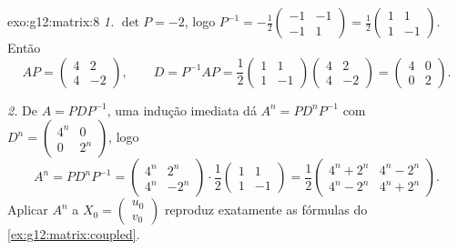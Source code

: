 \begin{solution}{exo:g12:matrix:8}
\emph{1.} $\det P = -2$, logo
$P^{-1} = -\frac12\begin{pmatrix} -1 & -1\\ -1 & 1\end{pmatrix}
= \frac12\begin{pmatrix} 1 & 1\\ 1 & -1\end{pmatrix}$. Então
\[
AP = \begin{pmatrix} 4 & 2\\ 4 & -2 \end{pmatrix}, \qquad
D = P^{-1}AP = \frac12\begin{pmatrix} 1&1\\1&-1\end{pmatrix}
\begin{pmatrix} 4&2\\4&-2\end{pmatrix}
= \begin{pmatrix} 4 & 0\\ 0 & 2\end{pmatrix}.
\]

\emph{2.} De $A = PDP^{-1}$, uma indução imediata dá
$A^n = PD^nP^{-1}$ com
$D^n = \begin{pmatrix} 4^n & 0\\ 0 & 2^n\end{pmatrix}$, logo
\[
A^n = P D^n P^{-1}
= \begin{pmatrix} 4^n & 2^n\\ 4^n & -2^n\end{pmatrix}\cdot
\frac12\begin{pmatrix} 1&1\\1&-1\end{pmatrix}
= \frac12\begin{pmatrix} 4^n + 2^n & 4^n - 2^n\\
4^n - 2^n & 4^n + 2^n\end{pmatrix}.
\]
Aplicar $A^n$ a $X_0 = \begin{pmatrix} u_0\\v_0\end{pmatrix}$ reproduz
exatamente as fórmulas do \cref{ex:g12:matrix:coupled}.
\end{solution}


